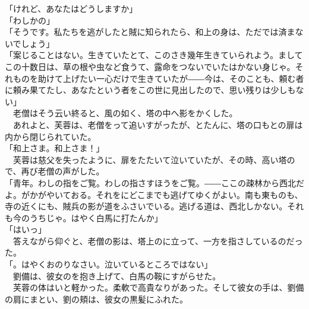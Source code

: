 \documentclass[
  paper=a5,
  fontsize=10pt,
  jafontsize=9.5pt,
  tate,                  %
  open_bracket_pos=nibu, %
]{jlreq}
\begin{document}
「けれど、あなたはどうしますか」\\


「わしかの」\\


「そうです。私たちを逃がしたと賊に知られたら、和上の身は、ただでは済まないでしょう」\\


「案じることはない。生きていたとて、このさき幾年生きていられよう。ましてこの十数日は、草の根や虫など食うて、露命をつないでいたはかない身じゃ。それものを助けて上げたい一心だけで生きていたが――今は、そのことも、頼む者に頼み果てたし、あなたという者をこの世に見出したので、思い残りは少しもない」\\


　老僧はそう云い終ると、風の如く、塔の中へ影をかくした。\\


　あれよと、芙蓉は、老僧をって追いすがったが、とたんに、塔の口もとの扉は内から閉じられていた。\\


「和上さま。和上さま！」\\


　芙蓉は慈父を失ったように、扉をたたいて泣いていたが、その時、高い塔ので、再び老僧の声がした。\\


「青年。わしの指をご覧。わしの指さすほうをご覧。――ここの疎林から西北だよ。がかがやいておる。それをにどこまでも逃げてゆくがよい。南も東ものも、寺の近くにも、賊兵の影が道をふさいでいる。逃げる道は、西北しかない。それも今のうちじゃ。はやく白馬に打たんか」\\


「はいっ」\\


　答えながら仰ぐと、老僧の影は、塔上のに立って、一方を指さしているのだった。\\


「。はやくおのりなさい。泣いているところではない」\\


　劉備は、彼女のを抱き上げて、白馬の鞍にすがらせた。\\


　芙蓉の体はいと軽かった。柔軟で高貴なりがあった。そして彼女の手は、劉備の肩にまとい、劉の頬は、彼女の黒髪にふれた。\\
\end{document}
